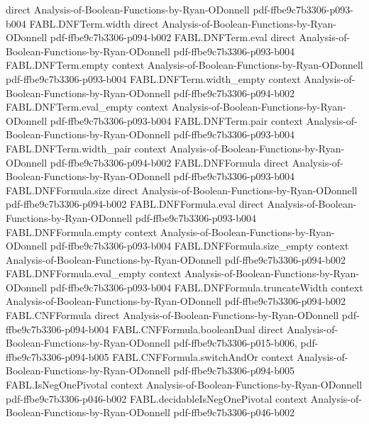\begin{theorem}
  {direct}
  {Analysis-of-Boolean-Functions-by-Ryan-ODonnell}
  {pdf-ffbe9c7b3306-p093-b004}
\proofstep
  {FABL.DNFTerm.width}
  {direct}
  {Analysis-of-Boolean-Functions-by-Ryan-ODonnell}
  {pdf-ffbe9c7b3306-p094-b002}
\proofstep
  {FABL.DNFTerm.eval}
  {direct}
  {Analysis-of-Boolean-Functions-by-Ryan-ODonnell}
  {pdf-ffbe9c7b3306-p093-b004}
\proofstep
  {FABL.DNFTerm.empty}
  {context}
  {Analysis-of-Boolean-Functions-by-Ryan-ODonnell}
  {pdf-ffbe9c7b3306-p093-b004}
\proofstep
  {FABL.DNFTerm.width_empty}
  {context}
  {Analysis-of-Boolean-Functions-by-Ryan-ODonnell}
  {pdf-ffbe9c7b3306-p094-b002}
\proofstep
  {FABL.DNFTerm.eval_empty}
  {context}
  {Analysis-of-Boolean-Functions-by-Ryan-ODonnell}
  {pdf-ffbe9c7b3306-p093-b004}
\proofstep
  {FABL.DNFTerm.pair}
  {context}
  {Analysis-of-Boolean-Functions-by-Ryan-ODonnell}
  {pdf-ffbe9c7b3306-p093-b004}
\proofstep
  {FABL.DNFTerm.width_pair}
  {context}
  {Analysis-of-Boolean-Functions-by-Ryan-ODonnell}
  {pdf-ffbe9c7b3306-p094-b002}
\proofstep
  {FABL.DNFFormula}
  {direct}
  {Analysis-of-Boolean-Functions-by-Ryan-ODonnell}
  {pdf-ffbe9c7b3306-p093-b004}
\proofstep
  {FABL.DNFFormula.size}
  {direct}
  {Analysis-of-Boolean-Functions-by-Ryan-ODonnell}
  {pdf-ffbe9c7b3306-p094-b002}
\proofstep
  {FABL.DNFFormula.eval}
  {direct}
  {Analysis-of-Boolean-Functions-by-Ryan-ODonnell}
  {pdf-ffbe9c7b3306-p093-b004}
\proofstep
  {FABL.DNFFormula.empty}
  {context}
  {Analysis-of-Boolean-Functions-by-Ryan-ODonnell}
  {pdf-ffbe9c7b3306-p093-b004}
\proofstep
  {FABL.DNFFormula.size_empty}
  {context}
  {Analysis-of-Boolean-Functions-by-Ryan-ODonnell}
  {pdf-ffbe9c7b3306-p094-b002}
\proofstep
  {FABL.DNFFormula.eval_empty}
  {context}
  {Analysis-of-Boolean-Functions-by-Ryan-ODonnell}
  {pdf-ffbe9c7b3306-p093-b004}
\proofstep
  {FABL.DNFFormula.truncateWidth}
  {context}
  {Analysis-of-Boolean-Functions-by-Ryan-ODonnell}
  {pdf-ffbe9c7b3306-p094-b002}
\proofstep
  {FABL.CNFFormula}
  {direct}
  {Analysis-of-Boolean-Functions-by-Ryan-ODonnell}
  {pdf-ffbe9c7b3306-p094-b004}
\proofstep
  {FABL.CNFFormula.booleanDual}
  {direct}
  {Analysis-of-Boolean-Functions-by-Ryan-ODonnell}
  {pdf-ffbe9c7b3306-p015-b006,
    pdf-ffbe9c7b3306-p094-b005}
\proofstep
  {FABL.CNFFormula.switchAndOr}
  {context}
  {Analysis-of-Boolean-Functions-by-Ryan-ODonnell}
  {pdf-ffbe9c7b3306-p094-b005}
\proofstep
  {FABL.IsNegOnePivotal}
  {context}
  {Analysis-of-Boolean-Functions-by-Ryan-ODonnell}
  {pdf-ffbe9c7b3306-p046-b002}
\proofstep
  {FABL.decidableIsNegOnePivotal}
  {context}
  {Analysis-of-Boolean-Functions-by-Ryan-ODonnell}
  {pdf-ffbe9c7b3306-p046-b002}

\end{theorem}
